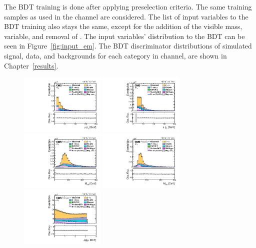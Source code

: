 The BDT training is done after applying preselection criteria. The same training samples as used in the \mue channel are considered. The list of input variables to the BDT training also stays the same, except for the addition of the visible mass, \mvis variable, and removal of \mtemet. The input variables' distribution to the BDT can be seen in Figure~\ref{fig:input_em}. The BDT discriminator distributions of simulated signal, data, and backgrounds for each category in \emu channel, are shown in Chapter~\ref{results}.

\begin{figure}[htbp!]
  \centering
  \includegraphics[width=0.36\textwidth]{plots/chapter6/emu/mPt.pdf}
  \includegraphics[width=0.36\textwidth]{plots/chapter6/emu/ePt.pdf}\\
  \includegraphics[width=0.36\textwidth]{plots/chapter6/emu/e_m_CollMass.pdf}
  \includegraphics[width=0.36\textwidth]{plots/chapter6/emu/e_m_Mass.pdf}\\
  \includegraphics[width=0.36\textwidth]{plots/chapter6/emu/dPhiMuMET.pdf}

\end{figure}

